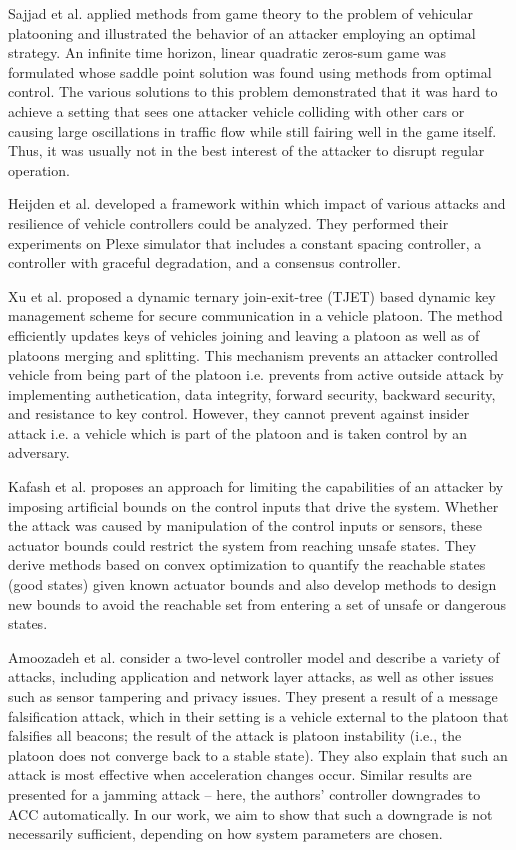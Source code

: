 Sajjad et al. \cite{SSG17} applied methods from game theory to the problem of vehicular platooning and illustrated the behavior of an attacker employing an optimal strategy.  An infinite time horizon, linear quadratic zeros-sum game was formulated whose saddle point solution was found using methods from optimal control. The various solutions to this problem demonstrated that it was hard to achieve a setting that sees one  attacker vehicle colliding with other cars or causing large oscillations in traffic flow while still fairing well in the game itself. Thus, it was usually not in the best interest of the attacker to disrupt regular operation. 

Heijden et al. \cite{HLK17} developed a framework within which impact of various attacks and resilience of vehicle controllers could be analyzed. They performed their experiments on Plexe simulator that includes a constant spacing controller, a controller with graceful degradation, and a consensus controller. 

Xu et al. \cite{XLWZH17} proposed a dynamic ternary join-exit-tree (TJET) based dynamic key management scheme for secure communication in a vehicle platoon. The method efficiently updates keys of vehicles joining and leaving a platoon as well as of platoons merging and splitting. This mechanism prevents an attacker controlled vehicle from being part of the platoon i.e. prevents from active outside attack by implementing authetication, data integrity, forward security, backward security, and resistance to key control. However, they cannot prevent against insider attack i.e. a vehicle which is part of the platoon and is taken control by an adversary.  

 Kafash et al. \cite{KGMCR17} proposes an approach for limiting the capabilities of an attacker by imposing artificial bounds on the control inputs that drive the system. Whether the attack was caused by manipulation of the control inputs or sensors, these actuator bounds could restrict the system from reaching unsafe states. They derive methods based on convex optimization to quantify the reachable states (good states) given known actuator bounds and also develop methods to design new bounds to avoid the reachable set from entering a set of unsafe or dangerous states. 

Amoozadeh et al. \cite{ARCGZRL15} consider a two-level controller model and describe a variety of attacks, including application and network layer attacks, as well as other issues such as sensor tampering and privacy issues. They present a result of a message falsification attack, which in their setting is a vehicle external to the platoon that falsifies all beacons; the result of the attack is platoon instability (i.e., the platoon does not converge back to a stable state). They also explain that such an attack is most effective when acceleration changes occur. Similar results are presented for a jamming attack – here, the authors’ controller downgrades to ACC automatically. In our work, we aim to show that such a downgrade is not necessarily sufficient, depending on how system parameters are chosen.

